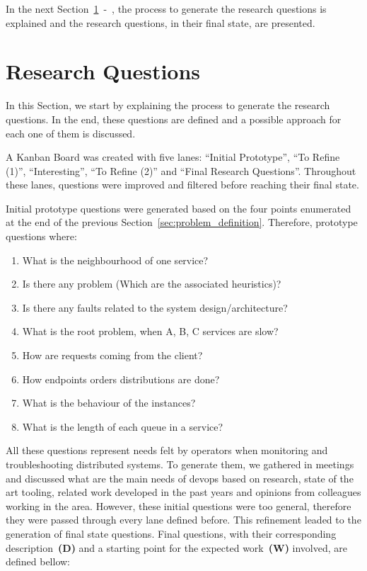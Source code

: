 In the next Section~\ref{sec:research_questions}~-~, the process to generate the research questions is explained and the research questions, in their final state, are presented.

\section{Research Questions}
\label{sec:research_questions}

In this Section, we start by explaining the process to generate the research questions. In the end, these questions are defined and a possible approach for each one of them is discussed.

A Kanban Board was created with five lanes: ``Initial Prototype'', ``To Refine (1)'', ``Interesting'', ``To Refine (2)'' and ``Final Research Questions''. Throughout these lanes, questions were improved and filtered before reaching their final state. 

Initial prototype questions were generated based on the four points enumerated at the end of the previous Section~\ref{sec:problem_definition}.  Therefore, prototype questions where:

\newpage

\begin{enumerate}
    \item What is the neighbourhood of one service?
    \item Is there any problem (Which are the associated heuristics)?
    \item Is there any faults related to the system design/architecture?
    \item What is the root problem, when A, B, C services are slow?
    \item How are requests coming from the client?
    \item How endpoints orders distributions are done?
    \item What is the behaviour of the instances?
    \item What is the length of each queue in a service?
\end{enumerate}

All these questions represent needs felt by operators when monitoring and troubleshooting distributed systems. To generate them, we gathered in meetings and discussed what are the main needs of \gls{devops} based on research, state of the art tooling, related work developed in the past years and opinions from colleagues working in the area. However, these initial questions were too general, therefore they were passed through every lane defined before. This refinement leaded to the generation of final state questions. Final questions, with their corresponding description~\textbf{(D)} and a starting point for the expected work~\textbf{(W)} involved, are defined bellow:

